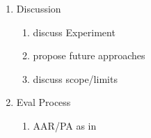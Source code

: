 \begin{enumerate}
	\item Discussion
	\begin{enumerate} 
		\item discuss Experiment
		\item propose future approaches
		\item discuss scope/limits
	\end{enumerate}		
	
	\item Eval Process
	\begin{enumerate} 
		\item AAR/PA as in \cite{Rainer2006}
	\end{enumerate}	
\end{enumerate}